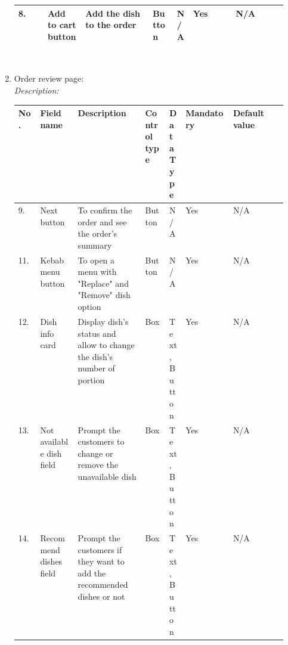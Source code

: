 \documentclass[a4paper,11pt]{extarticle}
\begin{document}
\begin{enumerate}[wide=0pt]
\begin{tabularx}{\textwidth}{|l|p{0.14\linewidth}|p{0.25\linewidth}|p{0.09\linewidth}|p{0.065\linewidth}|l|X|}
        \hline
        8. & Add to cart button & Add the dish to the order & Button & N/A & Yes & N/A \\
        \hline
    \end{tabularx} 
    \\
    \item Order review page: \\
    \emph{Description:}  \\
    \begin{tabularx}{\textwidth}{|l|p{0.14\linewidth}|p{0.25\linewidth}|p{0.09\linewidth}|p{0.065\linewidth}|l|X|}
        \hline
        \textbf{No.} & \textbf{Field name} & \textbf{Description} & \textbf{Control type} & \textbf{Data Type} & \textbf{Mandatory} & \textbf{Default value} \\
        \hline
        9. & Next button & To confirm the order and see the order's summary & Button & N/A & Yes & N/A \\
        \hline
        11. & Kebab menu button & To open a menu with "Replace" and "Remove" dish option  & Button & N/A & Yes & N/A \\ 
        \hline
        12. & Dish info card & Display dish's status and allow to change the dish's number of portion & Box & Text, Button & Yes & N/A \\ 
        \hline
        13. & Not available dish field & Prompt the customers to change or remove the unavailable dish & Box & Text, Button & Yes & N/A \\
        \hline
        14. & Recommend dishes field & Prompt the customers if they want to add the recommended dishes or not & Box & Text, Button & Yes & N/A \\
        \hline
    \end{tabularx}
    
        \begin{figure}[htbp]
            \centering
\end{figure}
\end{enumerate}
\end{document}
